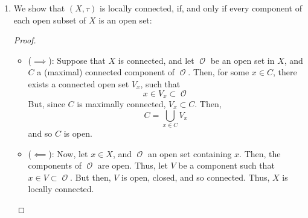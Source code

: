 \documentclass{book}
\DeclareMathOperator*{\Ocal}{\mathcal{O}}
\begin{document}
\begin{enumerate}[(1)]
    \item We show that $(X, \tau)$ is locally connected, if, and only if every component of each open subset of $X$ is an open set: 
        \begin{proof} 
            \begin{itemize}
                \item[] ($\implies$): Suppose that $X$ is connected, and let $\Ocal$ be an open set in $X$, and $C$ a (maximal) connected component of $\Ocal$. Then, for some $x \in C$, there exists a connected open set $V_x$, such that 
                    \[x \in V_x \subset \Ocal\]
                    But, since $C$ is maximally connected, $V_x \subset C$. Then, 
                    \[C = \bigcup_{x \in C} V_x \]
                    and so $C$ is open. 

                \item[]  ($\impliedby$): Now, let $x \in X$, and $\Ocal$ an open set containing $x$. Then, the components of $\Ocal$ are open. Thus, let $V$ be a component such that $x \in V \subset \Ocal$. But then, $V$ is open, closed, and so connected. Thus, $X$ is locally connected. 
            \end{itemize}
        \end{proof}

\end{enumerate}
\end{document}
